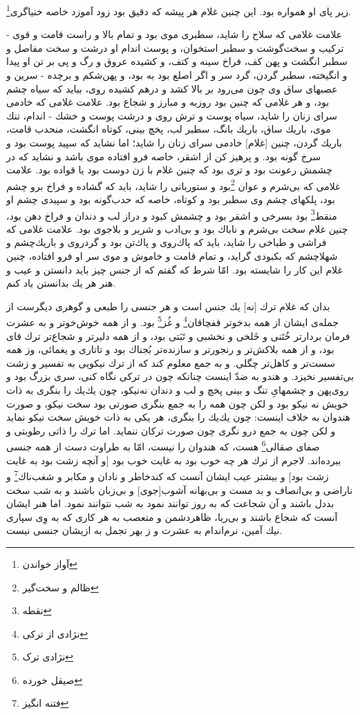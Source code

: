 زير پاى او همواره بود. اين چنين غلام هر پيشه كه دقيق بود زود آموزد خاصه خنياگرى\footnote{آواز خواندن}.

علامت غلامى كه سلاح را شايد، سطبرى موى بود و تمام بالا و راست قامت و قوى - تركيب و سخت‌گوشت و سطبر استخوان، و پوست اندام او درشت و سخت مفاصل و سطبر انگشت و پهن كف، فراخ سينه و كتف، و كشيده عروق و رگ و پى بر تن او پيدا و انگيخته، سطبر گردن، گرد سر و اگر اصلع بود به بود، و پهن‌شكم و برچده - سرين و عصبهاى ساق وى چون مى‌رود بر بالا كشد و درهم كشيده روى، ببايد كه سياه چشم بود، و هر غلامى كه چنين بود روزبه و مبارز و شجاع بود. علامت غلامى كه خادمى سراى زنان را شايد، سياه پوست و ترش روى و درشت پوست و خشك - اندام، تنك موى، باريك ساق، باريك بانگ، سطبر لب، پخچ بينى، كوتاه انگشت، منحدب قامت، باريك گردن، چنين [غلام] خادمى سراى زنان را شايد؛ اما نشايد كه سپيد پوست بود و سرخ گونه بود. و پرهيز كن از اشقر، خاصه فرو افتاده موى باشد و نشايد كه در چشمش رعونت بود و ترى بود كه چنين غلام با زن دوست بود يا قواده بود. علامت غلامى كه بى‌شرم و عوان \footnote{ظالم و سخت‌گیر}بود و ستوربانى را شايد، بايد كه گشاده و فراخ برو چشم بود، پلكهاى چشم وى سطبر بود و كوتاه، خاصه كه حدب‌گونه بود و سپيدى چشم او منقط\footnote{نقطه} بود بسرخى و اشقر بود و چشمش كبود و دراز لب و دندان و فراخ دهن بود، چنين غلام سخت بى‌شرم و ناباك بود و بى‌ادب و شرير و بلاجوى بود. علامت غلامى كه فراشى و طباخى را شايد، بايد كه پاك‌روى و پاك‌تن بود و گرد‌روى و باريك‌چشم و شهلا‌چشم كه بكبودى گرايد، و تمام قامت و خاموش و موى سر او فرو افتاده، چنين غلام اين كار را شايسته بود. امّا شرط كه گفتم كه از جنس چيز بايد دانستن و عيب و هنر هر يك بدانستن ياد كنم.

بدان كه غلام ترك [نه] يك جنس است و هر جنسى را طبعى و گوهرى ديگرست از جمله‌ی ايشان از همه بدخوتر قفچاقان\footnote{نژادی از ترکی} و غُز\footnote{نژادی ترک} بود. و از همه خوش‌خوتر و به عشرت فرمان بردارتر خُتَنى و خَلخى و نخشبى و تَبَتى بود، و از همه دليرتر و شجاع‌تر ترك قاى بود، و از همه بلاكش‌تر و رنجورتر و سازنده‌تر بُجناك بود و تاتارى و يغمائى، وز همه سست‌تر و كاهل‌تر چگلى. و به جمع معلوم كند كه از ترك نيكويى به تفسير و زشت بى‌تفسير نخيزد. و هندو به ضدّ اينست چنانكه چون در تركى نگاه كنى، سرى بزرگ بود و روى‌پهن و چشمهاى‌ِ تنگ و بينى پخچ و لب و دندان نه‌نيكو، چون يك‌يك را بنگرى به ذات خويش نه نيكو بود و لكن چون همه را به جمع بنگرى صورتى بود سخت نيكو، و صورت هندوان به خلاف اينست: چون يك‌يك را بنگرى، هر يكى به ذات خويش سخت نيكو نمايد و لكن چون به جمع درو نگرى چون صورت تركان ننمايد. اما ترك را ذاتى رطوبتى و صفاى صقالى\footnote{صیقل خورده} هست، كه هندوان را نيست، امّا به طراوت دست از همه جنسى ببرده‌اند. لاجرم از ترك هر چه خوب بود به غايت خوب بود [و آنچه زشت بود به غايت زشت بود] و بيشتر عيب ايشان آنست كه كند‌خاطر و نادان و مكابر و شغب‌ناك\footnote{فتنه انگیز} و ناراضى و بى‌انصاف و بد مست و بى‌بهانه آشوب‌[جوى] و بى‌زبان باشند و به شب سخت بددل باشند و آن شجاعت كه به روز توانند نمود به شب نتوانند نمود. اما هنر ايشان آنست كه شجاع باشند و بى‌ريا، ظاهر‌دشمن و متعصب به هر كارى كه به وِى سپارى نيك آمين، نرم‌اندام به عشرت و ز بهر تجمل به ازيشان جنسى نيست.


